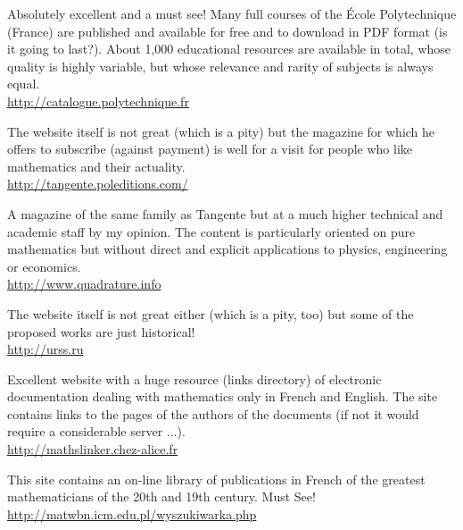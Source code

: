 	{\Large {}}{\Large {}}{\Large {}}{\Large {}}\bcdfrance{} Absolutely excellent and a must see! Many full courses of the École Polytechnique (France) are published and available for free and to download in PDF format (is it going to last?). About 1,000 educational resources are available in total, whose quality is highly variable, but whose relevance and rarity of subjects is always equal.\\
	\href{http://catalogue.polytechnique.fr}{\color{blue} http://catalogue.polytechnique.fr}
	
	{\Large {}}{\Large {}}{\Large {}}{\Large {}}\bcdfrance{}  The website itself is not great (which is a pity) but the magazine for which he offers to subscribe (against payment) is well for a visit for people who like mathematics and their actuality.\\
	\href{http://tangente.poleditions.com/}{\color{blue}http://tangente.poleditions.com/}
	
	{\Large {}}{\Large {}}{\Large {}}{\Large {}}\bcdfrance{} A magazine of the same family as Tangente but at a much higher technical and academic staff by my opinion. The content is particularly oriented on pure mathematics but without direct and explicit applications to physics, engineering or economics.\\
	\href{http://www.quadrature.info}{\color{blue}http://www.quadrature.info}
	
	{\Large {}}{\Large {}}{\Large {}}{\Large {}} The website itself is not great either (which is a pity, too) but some of the proposed works are just historical!\\
	\href{http://urss.ru}{\color{blue}http://urss.ru}
	
	{\Large {}}{\Large {}}{\Large {}}{\Large {}}\bcdfrance{} Excellent website with a huge resource (links directory) of electronic documentation dealing with mathematics only in French and English. The site contains links to the pages of the authors of the documents (if not it would require a considerable server ...).\\
	\href{http://mathslinker.chez-alice.fr}{\color{blue}http://mathslinker.chez-alice.fr}
	
	{\Large {}}\bcdfrance{} This site contains an on-line library of publications in French of the greatest mathematicians of the 20th and 19th century. Must See!\\
	\href{http://matwbn.icm.edu.pl/wyszukiwarka.php}{\color{blue}http://matwbn.icm.edu.pl/wyszukiwarka.php}
	
